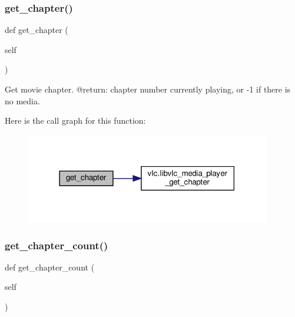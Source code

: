 \subsubsection{\texorpdfstring{get\+\_\+chapter()}{get\_chapter()}}
{\footnotesize\ttfamily def get\+\_\+chapter (\begin{DoxyParamCaption}\item[{}]{self }\end{DoxyParamCaption})}

\begin{DoxyVerb}Get movie chapter.
@return: chapter number currently playing, or -1 if there is no media.
\end{DoxyVerb}
 Here is the call graph for this function\+:
\nopagebreak
\begin{figure}[H]
\begin{center}
\leavevmode
\includegraphics[width=302pt]{classvlc_1_1_media_player_a61aac7a7f6bf0a4765bc9ca4e53ab1a6_cgraph}
\end{center}
\end{figure}
\mbox{\label{classvlc_1_1_media_player_a2e2abfffa1b82c0cf09b870524e0b274}} 
\subsubsection{\texorpdfstring{get\+\_\+chapter\+\_\+count()}{get\_chapter\_count()}}
{\footnotesize\ttfamily def get\+\_\+chapter\+\_\+count (\begin{DoxyParamCaption}\item[{}]{self }\end{DoxyParamCaption})}

